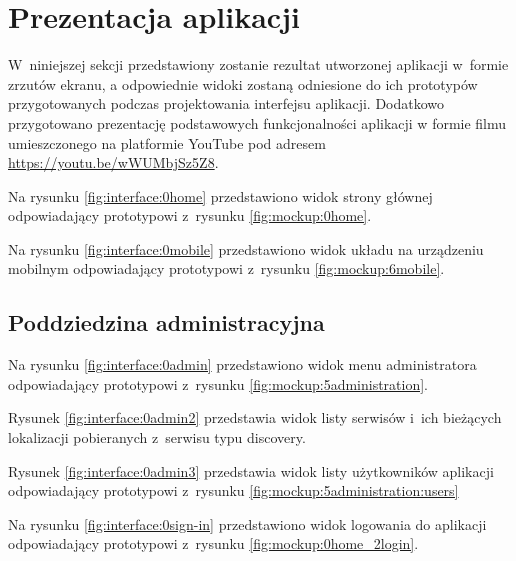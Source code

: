 \section{Prezentacja aplikacji}\label{sec:app-presentation}

W~niniejszej sekcji przedstawiony zostanie rezultat utworzonej aplikacji w~formie zrzutów ekranu,
a odpowiednie widoki zostaną odniesione do ich prototypów przygotowanych podczas projektowania interfejsu aplikacji.
Dodatkowo przygotowano prezentację podstawowych funkcjonalności aplikacji w formie filmu umieszczonego na platformie YouTube pod adresem \url{https://youtu.be/wWUMbjSz5Z8}.
\par
Na rysunku \ref{fig:interface:0home} przedstawiono widok strony głównej odpowiadający prototypowi z~rysunku \ref{fig:mockup:0home}.


Na rysunku \ref{fig:interface:0mobile} przedstawiono widok układu na urządzeniu mobilnym odpowiadający prototypowi z~rysunku \ref{fig:mockup:6mobile}.


\subsection{Poddziedzina administracyjna}

Na rysunku \ref{fig:interface:0admin} przedstawiono widok menu administratora odpowiadający prototypowi z~rysunku \ref{fig:mockup:5administration}.


Rysunek \ref{fig:interface:0admin2} przedstawia widok listy serwisów i~ich bieżących lokalizacji pobieranych z~serwisu typu discovery.


Rysunek \ref{fig:interface:0admin3} przedstawia widok listy użytkowników aplikacji odpowiadający prototypowi z~rysunku \ref{fig:mockup:5administration:users}


Na rysunku \ref{fig:interface:0sign-in} przedstawiono widok logowania do aplikacji odpowiadający prototypowi z~rysunku \ref{fig:mockup:0home_2login}.

